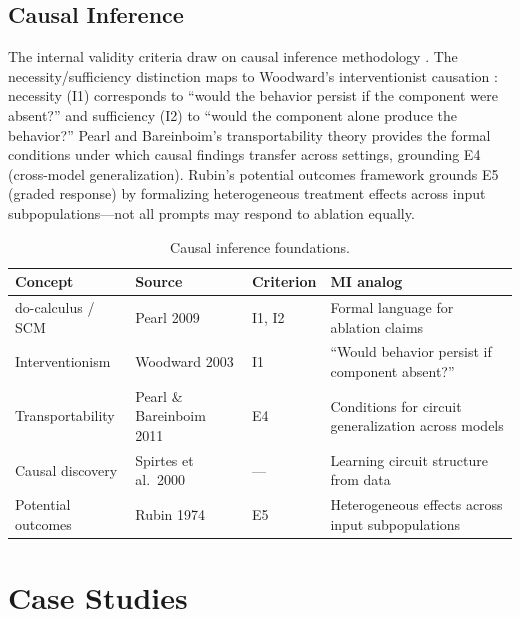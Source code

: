 \documentclass[10pt]{article}
\begin{document}
\subsection{Causal Inference}
\label{sec:causal}

The internal validity criteria draw on causal inference methodology \citep{pearl2009causality, spirtes2000causation}. The necessity/sufficiency distinction maps to Woodward's interventionist causation \citep{woodward2003making}: necessity (I1) corresponds to ``would the behavior persist if the component were absent?'' and sufficiency (I2) to ``would the component alone produce the behavior?'' Pearl and Bareinboim's transportability theory \citep{pearl2011transportability} provides the formal conditions under which causal findings transfer across settings, grounding E4 (cross-model generalization). Rubin's potential outcomes framework grounds E5 (graded response) by formalizing heterogeneous treatment effects across input subpopulations---not all prompts may respond to ablation equally.

\begin{table}[H]
\centering\small
\caption{Causal inference foundations.}
\renewcommand{\arraystretch}{1.12}
\begin{tabular}{@{}l>{\raggedright\arraybackslash}p{2.5cm}l>{\raggedright\arraybackslash}p{4.2cm}@{}}
\toprule
\textbf{Concept} & \textbf{Source} & \textbf{Criterion} & \textbf{MI analog} \\
\midrule
do-calculus / SCM & Pearl 2009 & I1, I2 & Formal language for ablation claims \\
\midrule
Interventionism & Woodward 2003 & I1 & ``Would behavior persist if component absent?'' \\
\midrule
Transportability & Pearl \& Bareinboim 2011 & E4 & Conditions for circuit generalization across models \\
\midrule
Causal discovery & Spirtes et al.\ 2000 & --- & Learning circuit structure from data \\
\midrule
Potential outcomes & Rubin 1974 & E5 & Heterogeneous effects across input subpopulations \\
\bottomrule
\end{tabular}
\end{table}

\section{Case Studies}
\label{sec:case-studies}
\end{document}
